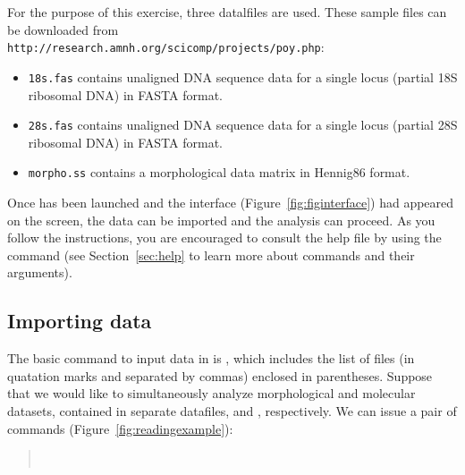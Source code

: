 For the purpose of this exercise, three datalfiles are used. These sample files can be downloaded from \\
\texttt{http://research.amnh.org/scicomp/projects/poy.php}:

\begin{itemize}
	\item {\texttt{18s.fas} contains unaligned DNA sequence data for a single locus (partial 18S ribosomal DNA) in FASTA format.}
	\item {\texttt{28s.fas} contains unaligned DNA sequence data for a single locus (partial 28S ribosomal DNA) in FASTA format.}
	\item {\texttt{morpho.ss} contains a morphological data matrix in Hennig86 format.}
\end{itemize}

Once \poy has been launched and the interface (Figure~\ref{fig:figinterface}) had appeared on the screen, the data can be imported and the analysis can proceed. As you follow the instructions, you are encouraged to consult the help file by using the command  (see Section~\ref{sec:help} to learn more about \poy commands and their arguments).

\subsection{Importing data} \label{sec:import}

The basic command to input data in \poy is , which includes the list of files (in quatation marks and separated by commas) enclosed in parentheses. Suppose that we would like to simultaneously analyze morphological and molecular datasets, contained in separate datafiles,  and , respectively. We can issue a pair of  commands (Figure~\ref{fig:readingexample}):
\begin{quote}
        \\
\end{quote}

